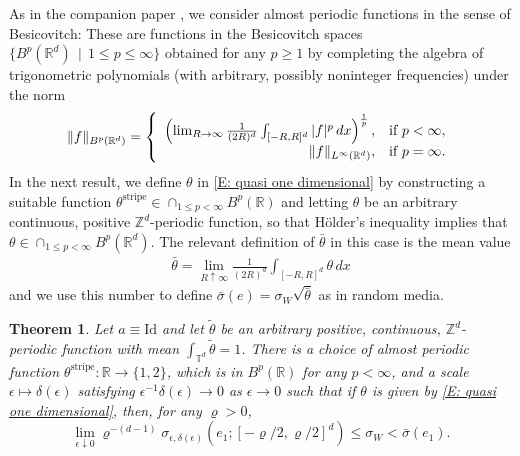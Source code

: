 \documentclass[12pt]{amsart}
\newtheorem{theorem}{Theorem}
\begin{document}
As in the companion paper \cite{part1}, we consider almost periodic functions in the sense of Besicovitch: These are functions in the Besicovitch spaces $\{ B^{p}(\mathbb{R}^{d}) \, \mid \, 1 \leq p \leq \infty\}$ obtained for any $p \geq 1$ by completing the algebra of trigonometric polynomials (with arbitrary, possibly noninteger frequencies) under the norm
	\begin{align*}
		\| f \|_{B^{p}(\mathbb{R}^{d})} = \left\{ \begin{array}{r l}
									\left( \lim_{ R \to \infty} \frac{1}{(2R)^{d}} \int_{[-R,R]^{d}} |f|^{p} \, dx \right)^{\frac{1}{p}} , & \text{if} \, \, p < \infty, \\
									\|f\|_{L^{\infty}(\mathbb{R}^{d})}, & \text{if} \, \, p = \infty .
								\end{array} \right.
	\end{align*}
In the next result, we define $\theta$ in \eqref{E: quasi one dimensional} by constructing a suitable function $\theta^{\text{stripe}} \in \cap_{ 1 \leq p < \infty } B^{p}(\mathbb{R})$ and letting $\theta$ be an arbitrary continuous, positive $\mathbb{Z}^{d}$-periodic function, so that H\"{o}lder's inequality implies that $\theta \in \cap_{1 \leq p < \infty} B^{p}(\mathbb{R}^{d})$.  The relevant definition of $\bar{\theta}$ in this case is the mean value
	\begin{align} \label{E: mean value}
		\bar{\theta} = \lim_{ R \uparrow \infty } \frac{ 1 }{ (2R)^{d} } \int_{ [ -R, R ]^{ d } } \theta \, dx 
	\end{align}
and we use this number to define $\bar{\sigma}(e) = \sigma_{W} \sqrt{ \bar{\theta} }$ as in random media. 

	\begin{theorem} \label{T: almost periodic counterexample}Let $a \equiv \text{Id}$ and let $\tilde{\theta}$ be an arbitrary positive, continuous, $\mathbb{Z}^{d}$-periodic function with mean $\int_{\mathbb{T}^{d}} \tilde{\theta} = 1$. There is a choice of almost periodic function $\theta^{\text{stripe}} : \mathbb{R} \to \{1,2\}$, which is in $B^{p}(\mathbb{R})$ for any $p < \infty$, and a scale $\epsilon \mapsto \delta(\epsilon)$ satisfying $\epsilon^{-1} \delta(\epsilon) \to 0$ as $\epsilon \to 0$ such that  if $\theta$ is given by \eqref{E: quasi one dimensional}, then, for any $\varrho > 0$,
		\begin{equation} \label{E: almost periodic example equation}
			\lim_{\epsilon \downarrow 0} \varrho^{-(d-1)} \sigma_{\epsilon,\delta(\epsilon)}(e_{1}; [-\varrho/2,\varrho/2]^{d} ) \leq \sigma_{W}  < \bar{\sigma}(e_{1}).
		\end{equation}		
	\end{theorem}
\end{document}
